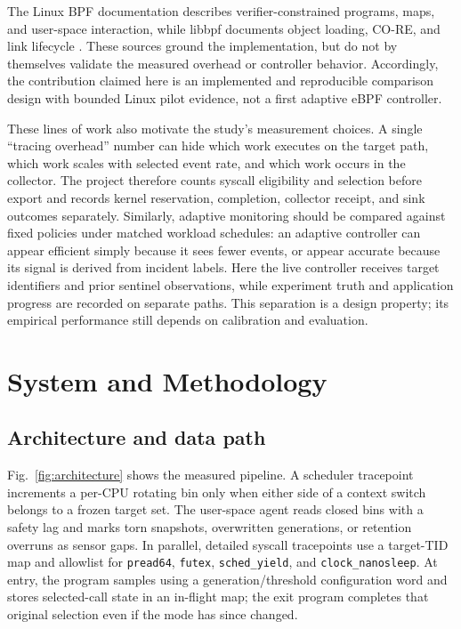 \documentclass[conference]{IEEEtran}
\begin{document}
The Linux BPF documentation describes verifier-constrained programs, maps, and user-space interaction, while libbpf documents object loading, CO-RE, and link lifecycle \cite{bpfdoc,libbpf}. These sources ground the implementation, but do not by themselves validate the measured overhead or controller behavior. Accordingly, the contribution claimed here is an implemented and reproducible comparison design with bounded Linux pilot evidence, not a first adaptive eBPF controller.

These lines of work also motivate the study's measurement choices. A single “tracing overhead” number can hide which work executes on the target path, which work scales with selected event rate, and which work occurs in the collector. The project therefore counts syscall eligibility and selection before export and records kernel reservation, completion, collector receipt, and sink outcomes separately. Similarly, adaptive monitoring should be compared against fixed policies under matched workload schedules: an adaptive controller can appear efficient simply because it sees fewer events, or appear accurate because its signal is derived from incident labels. Here the live controller receives target identifiers and prior sentinel observations, while experiment truth and application progress are recorded on separate paths. This separation is a design property; its empirical performance still depends on calibration and evaluation.

\section{System and Methodology}
\subsection{Architecture and data path}
Fig.~\ref{fig:architecture} shows the measured pipeline. A scheduler tracepoint increments a per-CPU rotating bin only when either side of a context switch belongs to a frozen target set. The user-space agent reads closed bins with a safety lag and marks torn snapshots, overwritten generations, or retention overruns as sensor gaps. In parallel, detailed syscall tracepoints use a target-TID map and allowlist for \texttt{pread64}, \texttt{futex}, \texttt{sched\_yield}, and \texttt{clock\_nanosleep}. At entry, the program samples using a generation/threshold configuration word and stores selected-call state in an in-flight map; the exit program completes that original selection even if the mode has since changed.
\end{document}

